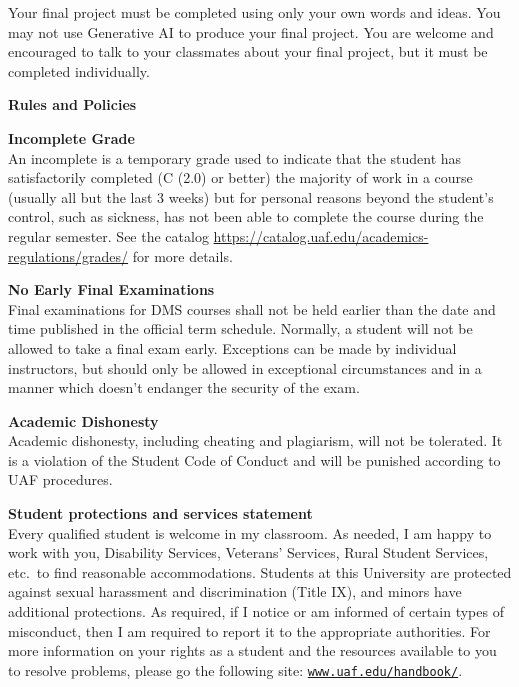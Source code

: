\documentclass[11pt]{article}
\renewcommand{\emph}[1]{\textsf{\textbf{#1}}}
\newcommand{\localhead}[1]{\par\smallskip\textbf{#1} \smallskip\nobreak\\}%
\def\heading#1{\localhead{\large\emph{#1}}}
\def\subheading#1{\localhead{\emph{#1}}}
\begin{document}
  
Your final project must be completed using only your own words and ideas. You may not use Generative AI to produce your final project. You are welcome and encouraged to talk to your classmates about your final project, but it must be completed individually.


\heading{Rules and Policies}
\vskip -20pt

\subheading{Incomplete Grade} 
An incomplete is a temporary grade used to indicate that the student has satisfactorily completed (C (2.0) or better) the majority of work in a course (usually all but the last 3 weeks) but for personal reasons beyond the student's control, such as sickness, has not been able to complete the course during the regular semester. See the catalog \url{https://catalog.uaf.edu/academics-regulations/grades/} for more details.


\subheading{No Early Final Examinations}
Final examinations for DMS
  courses shall not be held earlier than the date and time published
  in the official term schedule. Normally, a student will not be
  allowed to take a final exam early. Exceptions can be made by
  individual instructors, but should only be allowed in exceptional
  circumstances and in a manner which doesn't endanger the security of
  the exam.

\subheading{Academic Dishonesty}
Academic dishonesty, including cheating and plagiarism, will not
be tolerated.  It is a violation of the Student Code of Conduct
and will be punished according to UAF procedures.

\subheading{Student protections and services statement}
Every qualified student is welcome in my classroom.  As needed, I am happy to work with you, Disability Services, Veterans' Services, Rural Student Services, etc.~to find reasonable accommodations.  Students at this University are protected against sexual harassment and discrimination (Title IX), and minors have additional protections.  As required, if I notice or am informed of certain types of misconduct, then I am required to report it to the appropriate authorities.  For more information on your rights as a student and the resources available to you to resolve problems, please go the following site: \href{https://www.uaf.edu/handbook/}{\texttt{www.uaf.edu/handbook/}}.
\end{document}
